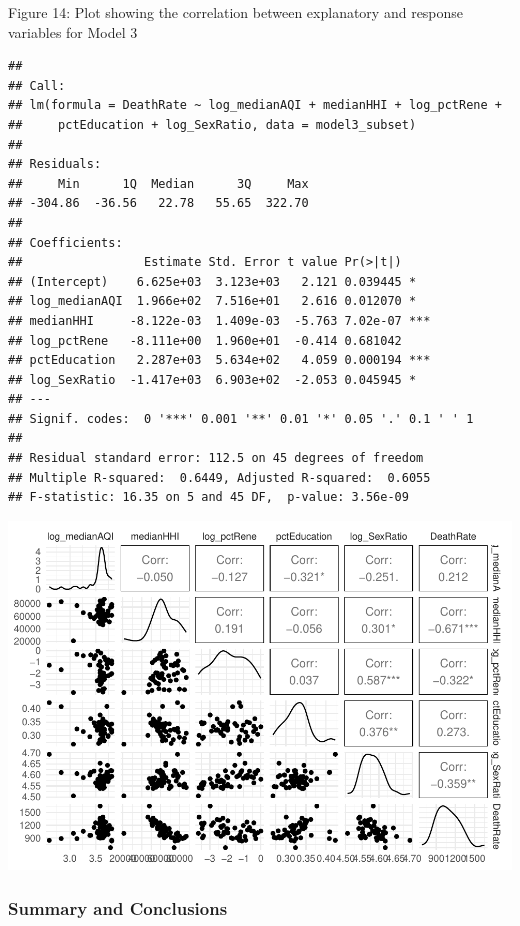\documentclass[
]{article}
\begin{document}
Figure 14: Plot showing the correlation between explanatory and response
variables for Model 3

\begin{verbatim}
## 
## Call:
## lm(formula = DeathRate ~ log_medianAQI + medianHHI + log_pctRene + 
##     pctEducation + log_SexRatio, data = model3_subset)
## 
## Residuals:
##     Min      1Q  Median      3Q     Max 
## -304.86  -36.56   22.78   55.65  322.70 
## 
## Coefficients:
##                 Estimate Std. Error t value Pr(>|t|)    
## (Intercept)    6.625e+03  3.123e+03   2.121 0.039445 *  
## log_medianAQI  1.966e+02  7.516e+01   2.616 0.012070 *  
## medianHHI     -8.122e-03  1.409e-03  -5.763 7.02e-07 ***
## log_pctRene   -8.111e+00  1.960e+01  -0.414 0.681042    
## pctEducation   2.287e+03  5.634e+02   4.059 0.000194 ***
## log_SexRatio  -1.417e+03  6.903e+02  -2.053 0.045945 *  
## ---
## Signif. codes:  0 '***' 0.001 '**' 0.01 '*' 0.05 '.' 0.1 ' ' 1
## 
## Residual standard error: 112.5 on 45 degrees of freedom
## Multiple R-squared:  0.6449, Adjusted R-squared:  0.6055 
## F-statistic: 16.35 on 5 and 45 DF,  p-value: 3.56e-09
\end{verbatim}

\includegraphics{EDA_Project_Mutha_Kry_Ghosh_VS_files/figure-latex/model3 results-1.pdf}

\newpage

\hypertarget{summary-and-conclusions}{%
\subsubsection{Summary and Conclusions}\label{summary-and-conclusions}}

\newpage
\end{document}
